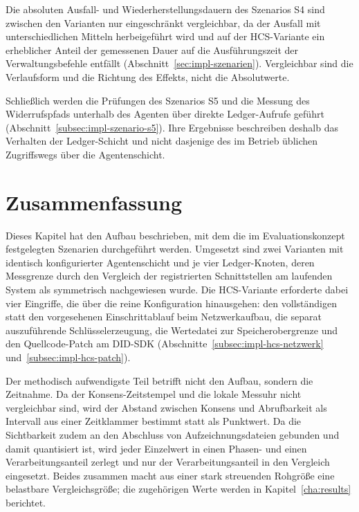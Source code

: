 Die absoluten Ausfall- und Wiederherstellungsdauern des Szenarios S4 sind zwischen den Varianten nur eingeschränkt vergleichbar, da der Ausfall mit unterschiedlichen Mitteln herbeigeführt wird und auf der HCS-Variante ein erheblicher Anteil der gemessenen Dauer auf die Ausführungszeit der Verwaltungsbefehle entfällt (Abschnitt~\ref{sec:impl-szenarien}). Vergleichbar sind die Verlaufsform und die Richtung des Effekts, nicht die Absolutwerte.

Schließlich werden die Prüfungen des Szenarios S5 und die Messung des Widerrufspfads unterhalb des Agenten über direkte Ledger-Aufrufe geführt (Abschnitt~\ref{subsec:impl-szenario-s5}). Ihre Ergebnisse beschreiben deshalb das Verhalten der Ledger-Schicht und nicht dasjenige des im Betrieb üblichen Zugriffswegs über die Agentenschicht.


\section{Zusammenfassung}
\label{sec:impl-zusammenfassung}

Dieses Kapitel hat den Aufbau beschrieben, mit dem die im Evaluationskonzept festgelegten Szenarien durchgeführt werden. Umgesetzt sind zwei Varianten mit identisch konfigurierter Agentenschicht und je vier Ledger-Knoten, deren Messgrenze durch den Vergleich der registrierten Schnittstellen am laufenden System als symmetrisch nachgewiesen wurde. Die HCS-Variante erforderte dabei vier Eingriffe, die über die reine Konfiguration hinausgehen: den vollständigen statt den vorgesehenen Einschrittablauf beim Netzwerkaufbau, die separat auszuführende Schlüsselerzeugung, die Wertedatei zur Speicherobergrenze und den Quellcode-Patch am DID-SDK (Abschnitte~\ref{subsec:impl-hcs-netzwerk} und~\ref{subsec:impl-hcs-patch}).

Der methodisch aufwendigste Teil betrifft nicht den Aufbau, sondern die Zeitnahme. Da der Konsens-Zeitstempel und die lokale Messuhr nicht vergleichbar sind, wird der Abstand zwischen Konsens und Abrufbarkeit als Intervall aus einer Zeitklammer bestimmt statt als Punktwert. Da die Sichtbarkeit zudem an den Abschluss von Aufzeichnungsdateien gebunden und damit quantisiert ist, wird jeder Einzelwert in einen Phasen- und einen Verarbeitungsanteil zerlegt und nur der Verarbeitungsanteil in den Vergleich eingesetzt. Beides zusammen macht aus einer stark streuenden Rohgröße eine belastbare Vergleichsgröße; die zugehörigen Werte werden in Kapitel~\ref{cha:results} berichtet.

